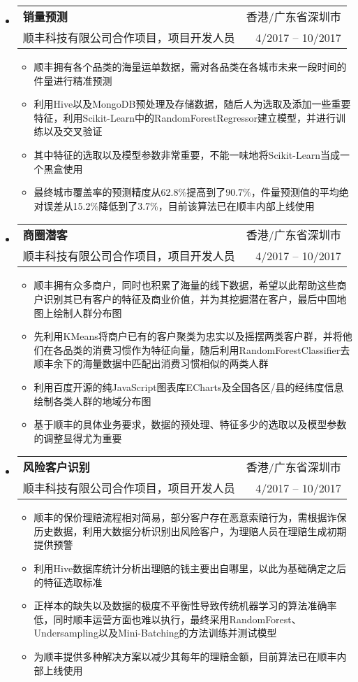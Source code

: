 \documentclass[letterpaper,9pt]{ctexart}
\makeatletter
\newcommand{\resitem}[1]{\item #1 \vspace{-2pt}}
\newcommand{\ressubheading}[4]{
\begin{tabular*}{6.5in}{l@{\extracolsep{\fill}}r}
    \textbf{#1} & #2 \\
    #3 & #4 \\
\end{tabular*}\vspace{-6pt}}
\makeatother
\begin{document}
\begin{itemize}
\item 
\ressubheading{销量预测}{香港/广东省深圳市}{顺丰科技有限公司合作项目，项目开发人员}{4/2017 -- 10/2017}
\begin{itemize}
\resitem{顺丰拥有各个品类的海量运单数据，需对各品类在各城市未来一段时间的件量进行精准预测}
\resitem{利用Hive以及MongoDB预处理及存储数据，随后人为选取及添加一些重要特征，利用Scikit-Learn中的RandomForestRegressor建立模型，并进行训练以及交叉验证}
\resitem{其中特征的选取以及模型参数非常重要，不能一味地将Scikit-Learn当成一个黑盒使用}
\resitem{最终城市覆盖率的预测精度从62.8\%提高到了90.7\%，件量预测值的平均绝对误差从15.2\%降低到了3.7\%，目前该算法已在顺丰内部上线使用}
\end{itemize}


\item 
\ressubheading{商圈潜客}{香港/广东省深圳市}{顺丰科技有限公司合作项目，项目开发人员}{4/2017 -- 10/2017}
\begin{itemize}
\resitem{顺丰拥有众多商户，同时也积累了海量的线下数据，希望以此帮助这些商户识别其已有客户的特征及商业价值，并为其挖掘潜在客户，最后中国地图上绘制人群分布图}
\resitem{先利用KMeans将商户已有的客户聚类为忠实以及摇摆两类客户群，并将他们在各品类的消费习惯作为特征向量，随后利用RandomForestClassifier去顺丰余下的海量数据中匹配出消费习惯相似的两类人群}
\resitem{利用百度开源的纯JavaScript图表库ECharts及全国各区/县的经纬度信息绘制各类人群的地域分布图}
\resitem{基于顺丰的具体业务要求，数据的预处理、特征多少的选取以及模型参数的调整显得尤为重要}
\end{itemize}


\item 
\ressubheading{风险客户识别}{香港/广东省深圳市}{顺丰科技有限公司合作项目，项目开发人员}{4/2017 -- 10/2017}
\begin{itemize}
\resitem{顺丰的保价理赔流程相对简易，部分客户存在恶意索赔行为，需根据诈保历史数据，利用大数据分析识别出风险客户，为理赔人员在理赔生成初期提供预警}
\resitem{利用Hive数据库统计分析出理赔的钱主要出自哪里，以此为基础确定之后的特征选取标准}
\resitem{正样本的缺失以及数据的极度不平衡性导致传统机器学习的算法准确率低，同时顺丰运营方面也难以执行，最终采用RandomForest、Undersampling以及Mini-Batching的方法训练并测试模型}
\resitem{为顺丰提供多种解决方案以减少其每年的理赔金额，目前算法已在顺丰内部上线使用}
\end{itemize}





\end{itemize}
\end{document}
